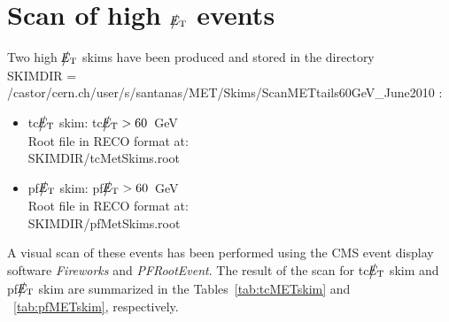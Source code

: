 \section{Scan of high $\big\slash\hspace{-1.6ex}{E_\text{T}}$ events}

Two high $\big\slash\hspace{-1.6ex}{E_\text{T}}$ skims have been produced and stored in the directory \\ 
SKIMDIR = /castor/cern.ch/user/s/santanas/MET/Skims/ScanMETtails60GeV\_June2010 :
\begin{itemize}
\item tc$\big\slash\hspace{-1.6ex}{E_\text{T}}$ skim: tc$\big\slash\hspace{-1.6ex}{E_\text{T}}>60$~GeV \\ 
Root file in RECO format at: \\ SKIMDIR/tcMetSkims.root
\item pf$\big\slash\hspace{-1.6ex}{E_\text{T}}$ skim: pf$\big\slash\hspace{-1.6ex}{E_\text{T}}>60$~GeV \\
Root file in RECO format at: \\ SKIMDIR/pfMetSkims.root
\end{itemize}

A visual scan of these events has been performed using the CMS event display
software {\it Fireworks} and {\it PFRootEvent}. 
The result of the scan for tc$\big\slash\hspace{-1.6ex}{E_\text{T}}$ skim and pf$\big\slash\hspace{-1.6ex}{E_\text{T}}$ skim are summarized 
in the Tables~\ref{tab:tcMETskim} and ~\ref{tab:pfMETskim}, respectively.

